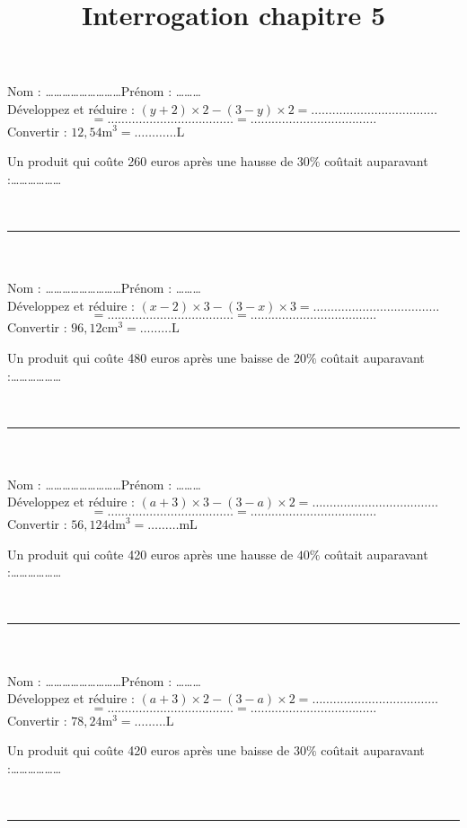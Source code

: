 \documentclass[14 pt, fleqn]{extarticle}
\title{Interrogation chapitre 5}
\date{}
\theoremstyle{plain}
\begin{document}
	

\baselineskip


 Nom : \ldots\ldots\ldots\ldots\ldots\ldots\ldots\ldots\ldots Prénom : \ldots\ldots\ldots \\ 
Développez et réduire :
 \( (y+2)\times 2 - (3 - y) \times 2 =\ldots\ldots\ldots\ldots\ldots\ldots\ldots\ldots\ldots\ldots\ldots\ldots \)
 \[ = \ldots\ldots\ldots\ldots\ldots\ldots\ldots\ldots\ldots\ldots\ldots\ldots = \ldots\ldots\ldots\ldots\ldots\ldots\ldots\ldots\ldots\ldots\ldots\ldots\]
 Convertir : 
 \( 12,54 \text{m}^3 = \ldots\ldots\ldots\ldots \text{L}\)
 
Un produit qui coûte 260 euros après une hausse de $30\%$ coûtait auparavant  :\ldots\ldots\ldots\ldots\ldots\ldots 
 
 \ \\  
 \hrule
 \ \\ \ \\
 Nom : \ldots\ldots\ldots\ldots\ldots\ldots\ldots\ldots\ldots Prénom : \ldots\ldots\ldots \\ 
Développez et réduire :
\((x-2)\times 3 - (3 - x) \times 3 =\ldots\ldots\ldots\ldots\ldots\ldots\ldots\ldots\ldots\ldots\ldots\ldots \)
 \[ = \ldots\ldots\ldots\ldots\ldots\ldots\ldots\ldots\ldots\ldots\ldots\ldots = \ldots\ldots\ldots\ldots\ldots\ldots\ldots\ldots\ldots\ldots\ldots\ldots\]
 Convertir : 
 \( 96,12\text{cm}^3 = \ldots\ldots\ldots \text{L}\)
 
Un produit qui coûte 480 euros après une baisse de $20\%$ coûtait auparavant  :\ldots\ldots\ldots\ldots\ldots\ldots 
 
 \ \\  
 
 \hrule
 \ \\ \ \\
 Nom : \ldots\ldots\ldots\ldots\ldots\ldots\ldots\ldots\ldots Prénom : \ldots\ldots\ldots \\ 
Développez et réduire :
 \( (a+3)\times 3 - (3- a) \times 2  =\ldots\ldots\ldots\ldots\ldots\ldots\ldots\ldots\ldots\ldots\ldots\ldots \)
 \[ = \ldots\ldots\ldots\ldots\ldots\ldots\ldots\ldots\ldots\ldots\ldots\ldots = \ldots\ldots\ldots\ldots\ldots\ldots\ldots\ldots\ldots\ldots\ldots\ldots\]
 Convertir : 
 \( 56,124 \text{dm}^3 = \ldots\ldots\ldots \text{mL}\)
 
Un produit qui coûte 420 euros après une hausse de $40\%$ coûtait auparavant  :\ldots\ldots\ldots\ldots\ldots\ldots 
 
 \ \\ 
 \hrule
 \ \\ \ \\
 Nom : \ldots\ldots\ldots\ldots\ldots\ldots\ldots\ldots\ldots Prénom : \ldots\ldots\ldots \\ 
Développez et réduire :
 \( (a+3)\times 2 - (3 - a) \times 2  =\ldots\ldots\ldots\ldots\ldots\ldots\ldots\ldots\ldots\ldots\ldots\ldots \)
 \[ = \ldots\ldots\ldots\ldots\ldots\ldots\ldots\ldots\ldots\ldots\ldots\ldots = \ldots\ldots\ldots\ldots\ldots\ldots\ldots\ldots\ldots\ldots\ldots\ldots\]
 Convertir : 
 \( 78,24 \text{m}^3 = \ldots\ldots\ldots \text{L}\)
 
Un produit qui coûte 420 euros après une baisse de $30\%$ coûtait auparavant  :\ldots\ldots\ldots\ldots\ldots\ldots 
 
 \ \\  
 \hrule
 
 
 
 	
\end{document}
